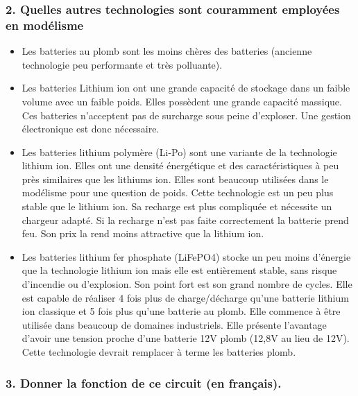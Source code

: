 \documentclass[french,a4paper,,tablecaptionabove]{scrartcl}
\begin{document}
\pagebreak

\hypertarget{quelles-autres-technologies-sont-couramment-employuxe9es-en-moduxe9lisme}{%
\subsubsection{2. Quelles autres technologies sont couramment employées
en
modélisme}\label{quelles-autres-technologies-sont-couramment-employuxe9es-en-moduxe9lisme}}

\begin{itemize}
\item
  Les batteries au plomb sont les moins chères des batteries (ancienne
  technologie peu performante et très polluante).
\item
  Les batteries Lithium ion ont une grande capacité de stockage dans un
  faible volume avec un faible poids. Elles possèdent une grande
  capacité massique. Ces batteries n'acceptent pas de surcharge sous
  peine d'exploser. Une gestion électronique est donc nécessaire.
\item
  Les batteries lithium polymère (Li-Po) sont une variante de la
  technologie lithium ion. Elles ont une densité énergétique et des
  caractéristiques à peu près similaires que les lithiums ion. Elles
  sont beaucoup utilisées dans le modélisme pour une question de poids.
  Cette technologie est un peu plus stable que le lithium ion. Sa
  recharge est plus compliquée et nécessite un chargeur adapté. Si la
  recharge n'est pas faite correctement la batterie prend feu. Son prix
  la rend moins attractive que la lithium ion.
\item
  Les batteries lithium fer phosphate (LiFePO4) stocke un peu moins
  d'énergie que la technologie lithium ion mais elle est entièrement
  stable, sans risque d'incendie ou d'explosion. Son point fort est son
  grand nombre de cycles. Elle est capable de réaliser 4 fois plus de
  charge/décharge qu'une batterie lithium ion classique et 5 fois plus
  qu'une batterie au plomb. Elle commence à être utilisée dans beaucoup
  de domaines industriels. Elle présente l'avantage d'avoir une tension
  proche d'une batterie 12V plomb (12,8V au lieu de 12V). Cette
  technologie devrait remplacer à terme les batteries plomb.
\end{itemize}

\pagebreak

\hypertarget{donner-la-fonction-de-ce-circuit-en-franuxe7ais.}{%
\subsubsection{3. Donner la fonction de ce circuit (en
français).}\label{donner-la-fonction-de-ce-circuit-en-franuxe7ais.}}
\end{document}
